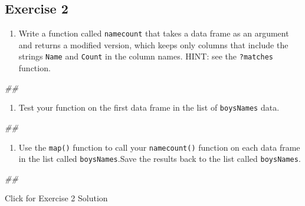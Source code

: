 \documentclass[
]{book}
\newenvironment{Shaded}{\begin{snugshade}}{\end{snugshade}}
\newcommand{\CommentTok}[1]{\textcolor[rgb]{0.56,0.35,0.01}{\textit{#1}}}
\providecommand{\tightlist}{%
  \setlength{\itemsep}{0pt}\setlength{\parskip}{0pt}}
\begin{document}
\hypertarget{exercise-2-2}{%
\subsection{Exercise 2}\label{exercise-2-2}}

\begin{enumerate}
\def\labelenumi{\arabic{enumi}.}
\tightlist
\item
  Write a function called \texttt{namecount} that takes a data frame as an argument and returns a modified version, which keeps only columns that include the strings \texttt{Name} and \texttt{Count} in the column names. HINT: see the \texttt{?matches} function.
\end{enumerate}

\begin{Shaded}
\begin{Highlighting}[]
\CommentTok{\#\# }
\end{Highlighting}
\end{Shaded}

\begin{enumerate}
\def\labelenumi{\arabic{enumi}.}
\setcounter{enumi}{1}
\tightlist
\item
  Test your function on the first data frame in the list of \texttt{boysNames} data.
\end{enumerate}

\begin{Shaded}
\begin{Highlighting}[]
\CommentTok{\#\# }
\end{Highlighting}
\end{Shaded}

\begin{enumerate}
\def\labelenumi{\arabic{enumi}.}
\setcounter{enumi}{2}
\tightlist
\item
  Use the \texttt{map()} function to call your \texttt{namecount()} function on each data frame in the list called \texttt{boysNames}.Save the results back to the list called \texttt{boysNames}.
\end{enumerate}

\begin{Shaded}
\begin{Highlighting}[]
\CommentTok{\#\# }
\end{Highlighting}
\end{Shaded}

{Click for Exercise 2 Solution}
\end{document}
